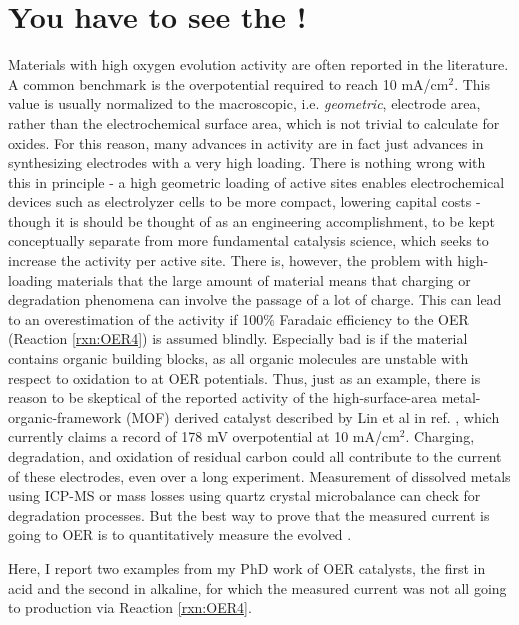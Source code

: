 \section{You have to see the !}\label{sec:see_the_O2}

Materials with high oxygen evolution activity are often reported in the literature. A common benchmark is the overpotential required to reach 10 mA/cm$^2$\cite{McCrory2013, Kibsgaard2019}. This value is usually normalized to the macroscopic, i.e. \textit{geometric}, electrode area, rather than the electrochemical surface area, which is not trivial to calculate for oxides. For this reason, many advances in activity are in fact just advances in synthesizing electrodes with a very high loading\cite{Kibsgaard2019}. There is nothing wrong with this in principle - a high geometric loading of active sites enables electrochemical devices such as electrolyzer cells to be more compact, lowering capital costs - though it is should be thought of as an engineering accomplishment, to be kept conceptually separate from more fundamental catalysis science, which seeks to increase the activity per active site\cite{Seh2017}. There is, however, the problem with high-loading materials that the large amount of material means that charging or degradation phenomena can involve the passage of a lot of charge. This can lead to an overestimation of the activity if 100\% Faradaic efficiency to the OER (Reaction \ref{rxn:OER4}) is assumed blindly. Especially bad is if the material contains organic building blocks, as all organic molecules are unstable with respect to oxidation to  at OER potentials. Thus, just as an example, there is reason to be skeptical of the reported activity of the high-surface-area metal-organic-framework (MOF) derived  catalyst described by Lin et al in ref. , which currently claims a record\cite{Kibsgaard2019} of 178 mV overpotential at 10 mA/cm$^2$. Charging, degradation, and oxidation of residual carbon could all contribute to the current of these electrodes, even over a long experiment. Measurement of dissolved metals using ICP-MS or mass losses using quartz crystal microbalance can check for degradation processes\cite{Frydendal2014}. But the best way to prove that the measured current is going to OER is to quantitatively measure the evolved . 

Here, I report two examples from my PhD work of OER catalysts, the first in acid and the second in alkaline, for which the measured current was not all going to  production via Reaction \ref{rxn:OER4}.

